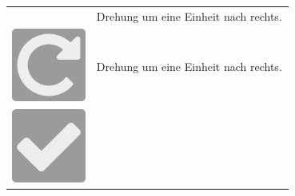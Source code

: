 \documentclass[12pt,a4paper, ngerman, oneside]{scrartcl}
\begin{document}
\begin{table}[h!]
\begin{tabular}{ c m{0.7\linewidth} }
\begin{minipage}{1cm}
    \end{minipage}
    &
    Drehung um eine Einheit nach rechts.
    \\
    \begin{minipage}{1cm}
      \includegraphics[width=\linewidth]{bilder/rotate-right}
    \end{minipage}
    &
    Drehung um eine Einheit nach rechts.
    \\
    \begin{minipage}{1cm}
      \includegraphics[width=\linewidth]{bilder/okay}

\end{minipage}
\end{tabular}
\end{table}
\end{document}
